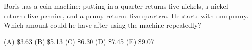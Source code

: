 Boris has a coin machine: putting in a quarter returns five nickels, a nickel returns five pennies, and a penny returns five quarters. He starts with one penny. Which amount could he have after using the machine repeatedly?

(A) \$3.63 \quad (B) \$5.13 \quad (C) \$6.30 \quad (D) \$7.45 \quad (E) \$9.07
